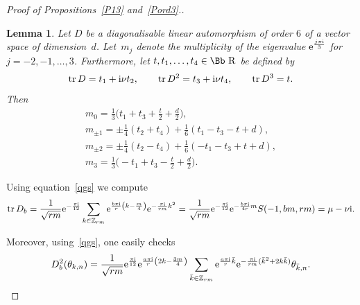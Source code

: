 \documentclass[pdftex]{sigma}
\newcommand\RR{{\mbox{\Bb R}}}
\newcommand\Z{{\mathbb Z}}
\newcommand{\tr}{\mathop{{\rm tr}}}
\numberwithin{equation}{section}
\newtheorem{Lemma}[Theorem]{Lemma}
\begin{document}
\begin{proof}[Proof of Propositions~\ref{P13} and~\ref{Pord3}.]
\begin{Lemma}\label{LD6}
Let $D$ be a diagonalisable linear automorphism of order $6$ of a vector space of dimension~$d$. Let~$m_j$ denote the multiplicity of the eigenvalue ${\rm e}^{\frac{j \pi {\rm i}}3}$ for $j=-2,-1,\dots,3$. Furthermore, let $t, t_1,\dots,t_4\in \RR$ be defined by
\begin{gather*}
\tr D= t_1+{\rm i}\nu t_2,\qquad \tr D^2= t_3+{\rm i}\nu t_4,\qquad \tr D^3=t.
\end{gather*}
Then
\begin{gather*}
m_0 = \frac13 \bigg(t_1+t_3+\frac t2+\frac d2 \bigg),\\[0.4ex]
m_{\pm1} = \pm\frac 14(t_2+t_4) +\frac16 (t_1-t_3-t+d),\\[0.4ex]
m_{\pm2} = \pm\frac 14(t_2-t_4) +\frac16 (-t_1-t_3+t+d),\\[0.4ex]
m_3 = \frac13 \bigg({-}t_1+t_3-\frac t2+\frac d2 \bigg).
\end{gather*}
\end{Lemma}
%
Using equation~\eqref{qgs} we compute
\begin{gather*}
\tr D_b= \frac1{\sqrt{rm}} {\rm e}^{-\frac {\pi {\rm i}}{12}}\sum_{k\in\Z_{rm}} {\rm e}^{\frac{b\pi {\rm i}}r\left(k-\frac m4\right)} {\rm e}^{-\frac{\pi {\rm i}}{rm}k^2}
= \frac1{\sqrt{rm}} {\rm e}^{-\frac {\pi {\rm i}}{12}} {\rm e}^{-\frac{b\pi {\rm i}}{4r}m}S(-1,bm,rm)
=\mu-\nu {\rm i}.
\end{gather*}

Moreover, using~\eqref{qgs}, one easily checks
\begin{gather*}
D_b^2(\theta_{k,n})=\frac1{\sqrt{rm}} {\rm e}^{\frac {\pi {\rm i}}{12}}{\rm e}^{\frac{a\pi {\rm i}}r\left(2k-\frac {3m}4\right)}\sum_{\bar k\in \Z_{rm}} {\rm e}^{\frac{a\pi {\rm i}}r \bar k } {\rm e}^{-\frac{\pi {\rm i}}{rm} (\bar k^2+2k\bar k) }\theta_{\bar k,n}.
\end{gather*}


\end{proof}
\end{document}
